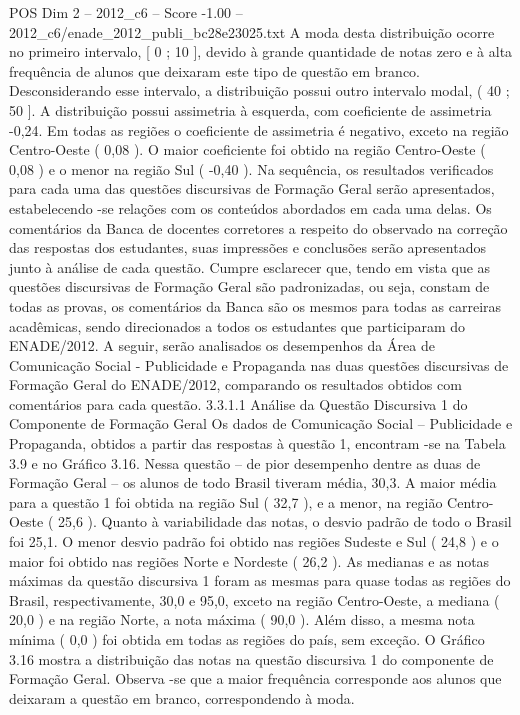 \begin{textsample}{POS Dim 2 – 2012\_c6 – Score -1.00 – 2012\_c6/enade\_2012\_publi\_bc28e23025.txt}
A moda desta distribuição ocorre no primeiro intervalo, [ 0 ; 10 ], devido à grande quantidade de notas zero e à alta frequência de alunos que deixaram este tipo de questão em branco.
Desconsiderando esse intervalo, a distribuição possui outro intervalo modal, ( 40 ; 50 ].
A distribuição possui assimetria à esquerda, com coeficiente de assimetria -0,24.
Em todas as regiões o coeficiente de assimetria é negativo, exceto na região Centro-Oeste ( 0,08 ).
O maior coeficiente foi obtido na região Centro-Oeste ( 0,08 ) e o menor na região Sul ( -0,40 ).
Na sequência, os resultados verificados para cada uma das questões discursivas de Formação Geral serão apresentados, estabelecendo -se relações com os conteúdos abordados em cada uma delas.
Os comentários da Banca de docentes corretores a respeito do observado na correção das respostas dos estudantes, suas impressões e conclusões serão apresentados junto à análise de cada questão.
Cumpre esclarecer que, tendo em vista que as questões discursivas de Formação Geral são padronizadas, ou seja, constam de todas as provas, os comentários da Banca são os mesmos para todas as carreiras acadêmicas, sendo direcionados a todos os estudantes que participaram do ENADE/2012.
A seguir, serão analisados os desempenhos da Área de Comunicação Social - Publicidade e Propaganda nas duas questões discursivas de Formação Geral do ENADE/2012, comparando os resultados obtidos com comentários para cada questão. 3.3.1.1 Análise da Questão Discursiva 1 do Componente de Formação Geral Os dados de Comunicação Social – Publicidade e Propaganda, obtidos a partir das respostas à questão 1, encontram -se na Tabela 3.9 e no Gráfico 3.16.
Nessa questão – de pior desempenho dentre as duas de Formação Geral – os alunos de todo Brasil tiveram média, 30,3.
A maior média para a questão 1 foi obtida na região Sul ( 32,7 ), e a menor, na região Centro-Oeste ( 25,6 ).
Quanto à variabilidade das notas, o desvio padrão de todo o Brasil foi 25,1.
O menor desvio padrão foi obtido nas regiões Sudeste e Sul ( 24,8 ) e o maior foi obtido nas regiões Norte e Nordeste ( 26,2 ).
As medianas e as notas máximas da questão discursiva 1 foram as mesmas para quase todas as regiões do Brasil, respectivamente, 30,0 e 95,0, exceto na região Centro-Oeste, a mediana ( 20,0 ) e na região Norte, a nota máxima ( 90,0 ).
Além disso, a mesma nota mínima ( 0,0 ) foi obtida em todas as regiões do país, sem exceção.
O Gráfico 3.16 mostra a distribuição das notas na questão discursiva 1 do componente de Formação Geral.
Observa -se que a maior frequência corresponde aos alunos que deixaram a questão em branco, correspondendo à moda.

\end{textsample}
